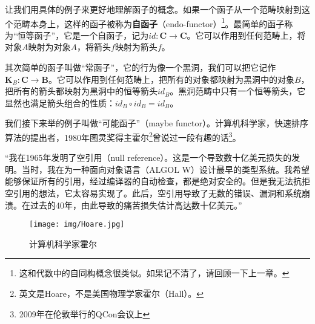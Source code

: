 \documentclass{article}
\begin{document}
 
让我们用具体的例子来更好地理解函子的概念。如果一个函子从一个范畴映射到这个范畴本身上，这样的函子被称为\textbf{自函子}（endo-functor）\footnote{这和代数中的自同构概念很类似。如果记不清了，请回顾一下上一章。}。最简单的函子称为“恒等函子”，它是一个自函子，记为$id: \pmb{C} \to \pmb{C}$。它可以作用到任何范畴上，将对象$A$映射为对象$A$，将箭头$f$映射为箭头$f$。

其次简单的函子叫做“常函子”，它的行为像一个黑洞，我们可以把它记作$\mathbf{K}_B : \pmb{C} \to \pmb{B}$。它可以作用到任何范畴上，把所有的对象都映射为黑洞中的对象$B$，把所有的箭头都映射为黑洞中的恒等箭头$id_B$。黑洞范畴中只有一个恒等箭头，它显然也满足箭头组合的性质：$id_B \circ id_B = id_B$。

\begin{example}
 
我们接下来举的例子叫做“可能函子”（maybe functor）。计算机科学家，快速排序算法的提出者，1980年图灵奖得主霍尔\footnote{英文是Hoare，不是美国物理学家霍尔（Hall）。}曾说过一段有趣的话\footnote{2009年在伦敦举行的QCon会议上}。

“我在1965年发明了空引用（null reference）。这是一个导致数十亿美元损失的发明。当时，我在为一种面向对象语言（ALGOL W）设计最早的类型系统。我希望能够保证所有的引用，经过编译器的自动检查，都是绝对安全的。但是我无法抗拒空引用的想法，它太容易实现了。此后，空引用导致了无数的错误、漏洞和系统崩溃。在过去的40年，由此导致的痛苦损失估计高达数十亿美元。”\cite{Wiki-Hoare}


\begin{figure}[htbp]
 \centering
 \texttt{[image: img/Hoare.jpg]}
 \captionsetup{labelformat=empty}
 \caption{计算机科学家霍尔}
 \label{fig:Hoare}
\end{figure}


\end{example}
\end{document}
